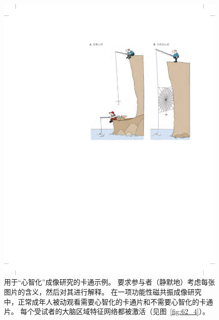 \begin{figure}[htbp]
	\centering
	\includegraphics[width=0.79\linewidth]{chap62/fig_62_3}
	\caption{用于“心智化”成像研究的卡通示例。
		要求参与者（静默地）考虑每张图片的含义，然后对其进行解释。
		在一项功能性磁共振成像研究中，正常成年人被动观看需要心智化的卡通片和不需要心智化的卡通片。
		每个受试者的大脑区域特征网络都被激活（见图~\ref{fig:62_4}）\cite{gallagher2000reading}。}
	\label{fig:62_3}
\end{figure}


